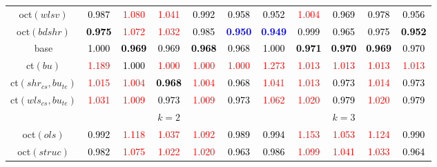 \begin{tabular}[t]{c|>{}cccc>{}c|ccccc}
oct$(wlsv)$ & \textcolor{black}{0.987} & \textcolor{red}{1.080} & \textcolor{red}{1.041} & \textcolor{black}{0.992} & \textcolor{black}{0.958} & \textcolor{black}{0.952} & \textcolor{red}{1.004} & \textcolor{black}{0.969} & \textcolor{black}{0.978} & \textcolor{black}{0.956}\\
oct$(bdshr)$ & \textcolor{black}{\textbf{0.975}} & \textcolor{red}{1.072} & \textcolor{red}{1.032} & \textcolor{black}{0.985} & \textcolor{blue}{\textbf{0.950}} & \textcolor{blue}{\textbf{0.949}} & \textcolor{black}{0.999} & \textcolor{black}{0.965} & \textcolor{black}{0.975} & \textcolor{black}{\textbf{0.952}}\\
base & \textcolor{black}{1.000} & \textcolor{black}{\textbf{0.969}} & \textcolor{black}{0.969} & \textcolor{black}{\textbf{0.968}} & \textcolor{black}{0.968} & \textcolor{black}{1.000} & \textcolor{black}{\textbf{0.971}} & \textcolor{black}{\textbf{0.970}} & \textcolor{black}{\textbf{0.969}} & \textcolor{black}{0.970}\\
ct$(bu)$ & \textcolor{red}{1.189} & \textcolor{black}{1.000} & \textcolor{red}{1.000} & \textcolor{red}{1.000} & \textcolor{red}{1.000} & \textcolor{red}{1.273} & \textcolor{red}{1.013} & \textcolor{red}{1.013} & \textcolor{red}{1.013} & \textcolor{red}{1.013}\\
ct$(shr_{cs}, bu_{te})$ & \textcolor{red}{1.015} & \textcolor{red}{1.004} & \textcolor{black}{\textbf{0.968}} & \textcolor{red}{1.004} & \textcolor{black}{0.968} & \textcolor{red}{1.041} & \textcolor{red}{1.013} & \textcolor{black}{0.973} & \textcolor{red}{1.014} & \textcolor{black}{0.973}\\
ct$(wls_{cs}, bu_{te})$ & \textcolor{red}{1.031} & \textcolor{red}{1.009} & \textcolor{black}{0.973} & \textcolor{red}{1.009} & \textcolor{black}{0.973} & \textcolor{red}{1.062} & \textcolor{red}{1.020} & \textcolor{black}{0.979} & \textcolor{red}{1.020} & \textcolor{black}{0.979}\\
\addlinespace[0.3em]
\multicolumn{1}{c}{} & \multicolumn{5}{c}{\textbf{$k = 2$}} & \multicolumn{5}{c}{\textbf{$k = 3$}}\\
oct$(ols)$ & \textcolor{black}{0.992} & \textcolor{red}{1.118} & \textcolor{red}{1.037} & \textcolor{red}{1.092} & \textcolor{black}{0.989} & \textcolor{black}{0.994} & \textcolor{red}{1.153} & \textcolor{red}{1.053} & \textcolor{red}{1.124} & \textcolor{black}{0.990}\\
oct$(struc)$ & \textcolor{black}{0.982} & \textcolor{red}{1.075} & \textcolor{red}{1.022} & \textcolor{red}{1.020} & \textcolor{black}{0.963} & \textcolor{black}{0.986} & \textcolor{red}{1.099} & \textcolor{red}{1.041} & \textcolor{red}{1.033} & \textcolor{black}{0.964}\\

\end{tabular}
